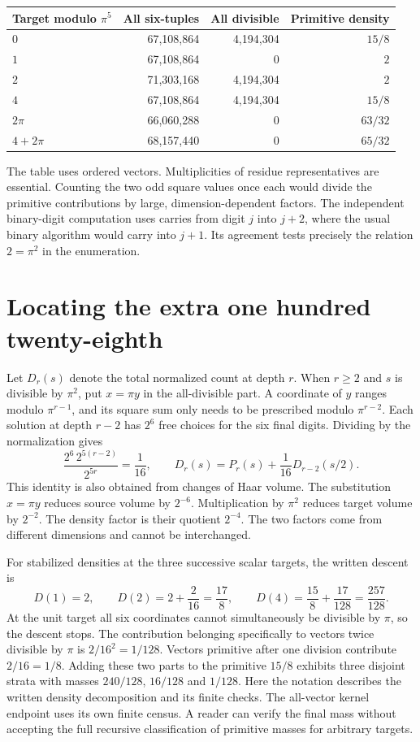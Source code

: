 \documentclass[12pt,letterpaper]{article}
\begin{document}
\begin{center}\small\begin{tabular}{lrrr}\toprule
Target modulo $\pi^5$&All six-tuples&All divisible&Primitive density\\\midrule
$0$ &67,108,864&4,194,304&$15/8$\\
$1$ &67,108,864&0&$2$\\
$2$ &71,303,168&4,194,304&$2$\\
$4$ &67,108,864&4,194,304&$15/8$\\
$2\pi$ &66,060,288&0&$63/32$\\
$4+2\pi$ &68,157,440&0&$65/32$\\\bottomrule
\end{tabular}\end{center}
The table uses ordered vectors. Multiplicities of residue representatives are essential. Counting the two odd square values once each would divide the primitive contributions by large, dimension-dependent factors. The independent binary-digit computation uses carries from digit $j$ into $j+2$, where the usual binary algorithm would carry into $j+1$. Its agreement tests precisely the relation $2=\pi^2$ in the enumeration.
\section{Locating the extra one hundred twenty-eighth}
Let $D_r(s)$ denote the total normalized count at depth $r$. When $r\ge2$ and $s$ is divisible by $\pi^2$, put $x=\pi y$ in the all-divisible part. A coordinate of $y$ ranges modulo $\pi^{r-1}$, and its square sum only needs to be prescribed modulo $\pi^{r-2}$. Each solution at depth $r-2$ has $2^6$ free choices for the six final digits. Dividing by the normalization gives
\[
 \frac{2^6\,2^{5(r-2)}}{2^{5r}}=\frac1{16},\qquad
 D_r(s)=P_r(s)+\frac1{16}D_{r-2}(s/2).
\]
This identity is also obtained from changes of Haar volume. The substitution $x=\pi y$ reduces source volume by $2^{-6}$. Multiplication by $\pi^2$ reduces target volume by $2^{-2}$. The density factor is their quotient $2^{-4}$. The two factors come from different dimensions and cannot be interchanged.
\par
For stabilized densities at the three successive scalar targets, the written descent is
\[
 D(1)=2,\qquad D(2)=2+\frac{2}{16}=\frac{17}{8},\qquad
 D(4)=\frac{15}{8}+\frac{17}{128}=\frac{257}{128}.
\]
At the unit target all six coordinates cannot simultaneously be divisible by $\pi$, so the descent stops. The contribution belonging specifically to vectors twice divisible by $\pi$ is $2/16^2=1/128$. Vectors primitive after one division contribute $2/16=1/8$. Adding these two parts to the primitive $15/8$ exhibits three disjoint strata with masses $240/128$, $16/128$ and $1/128$. Here the notation describes the written density decomposition and its finite checks. The all-vector kernel endpoint uses its own finite census. A reader can verify the final mass without accepting the full recursive classification of primitive masses for arbitrary targets.
\end{document}
